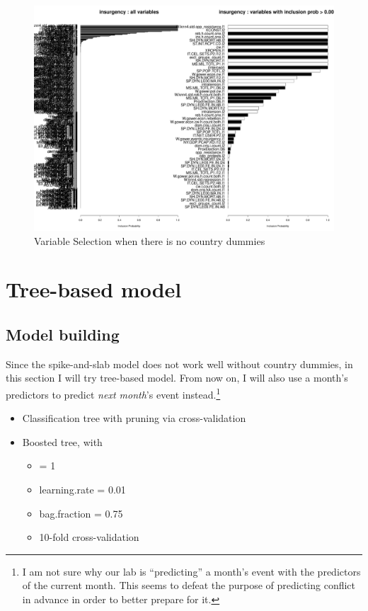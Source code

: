 \documentclass{article}
\begin{document}
\begin{figure}[H]
\includegraphics[width=\textwidth]{fig/nohierspikeslab_insurgencyvar}
\caption{Variable Selection when there is no country dummies}
\label{fig:nohierspikeslab_insurgencyvar} 
\end{figure}

\section{Tree-based model}

\subsection{Model building}

Since the spike-and-slab model does not work well without country dummies, in this section I will try tree-based model. From now on, I will also use a month's predictors to predict \textit{next month}'s event instead.\footnote{I am not sure why our lab is ``predicting'' a month's event with the predictors of the current month. This seems to defeat the purpose of predicting conflict in advance in order to better prepare for it.}

\begin{itemize}[noitemsep]
\item Classification tree with pruning via cross-validation
\item Boosted tree, with 
\begin{itemize}[noitemsep]
\item {} = 1
\item learning.rate = 0.01
\item bag.fraction = 0.75	
\item 10-fold cross-validation
\end{itemize}
\end{itemize}
\end{document}
